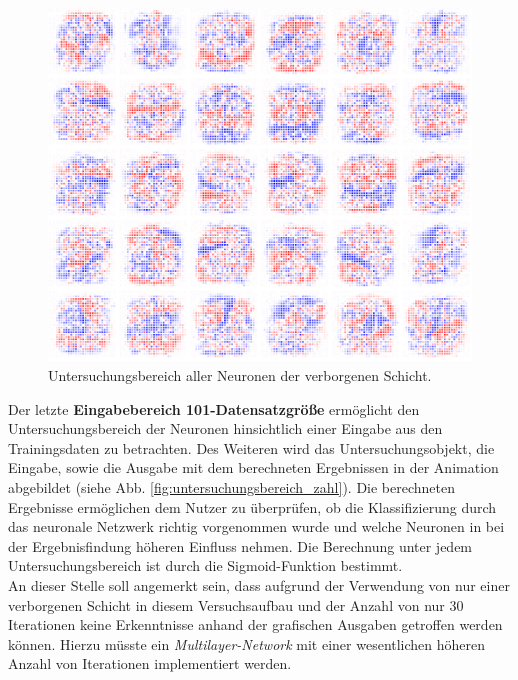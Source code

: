 \begin{figure}[hbt]
	\centering
	\includegraphics[scale=0.7]{Bilder/untersuchungsbereich_neuronen}
	\caption{Untersuchungsbereich aller Neuronen der verborgenen Schicht.} 
	\label{fig:untersuchungsbereich_neuronen} 
\end{figure}

\noindent
Der letzte \textbf{Eingabebereich 101-Datensatzgröße} ermöglicht den Untersuchungsbereich der Neuronen hinsichtlich einer Eingabe aus den Trainingsdaten zu betrachten. Des Weiteren wird das Untersuchungsobjekt, die Eingabe, sowie die Ausgabe mit dem berechneten Ergebnissen in der Animation abgebildet (siehe Abb. \ref{fig:untersuchungsbereich_zahl}). Die berechneten Ergebnisse ermöglichen dem Nutzer zu überprüfen, ob die Klassifizierung durch das neuronale Netzwerk richtig vorgenommen wurde und welche Neuronen in bei der Ergebnisfindung höheren Einfluss nehmen. Die Berechnung unter jedem Untersuchungsbereich ist durch die Sigmoid-Funktion bestimmt. \\

\noindent
An dieser Stelle soll angemerkt sein, dass aufgrund der Verwendung von nur einer verborgenen Schicht in diesem Versuchsaufbau und der Anzahl von nur 30 Iterationen keine Erkenntnisse anhand der grafischen Ausgaben getroffen werden können. Hierzu müsste ein \textit{Multilayer-Network} mit einer wesentlichen höheren Anzahl von Iterationen implementiert werden.

